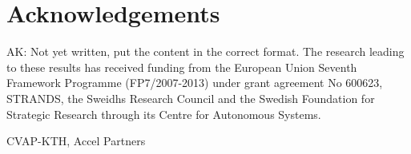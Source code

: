 \documentclass[letterpaper, 10 pt, conference]{ieeeconf}  %
\begin{document}

\section{Acknowledgements}
\label{sec:Acknowledgements}
{\color{blue} AK: Not yet written, put the content in the correct format.}
The research leading to these results has received funding from the European
Union Seventh Framework Programme (FP7/2007-2013) under grant agreement No 600623, STRANDS,
the Sweidhs Research Council and the Swedish Foundation for Strategic Research through its Centre for Autonomous Systems.

CVAP-KTH, Accel Partners




\end{document}
